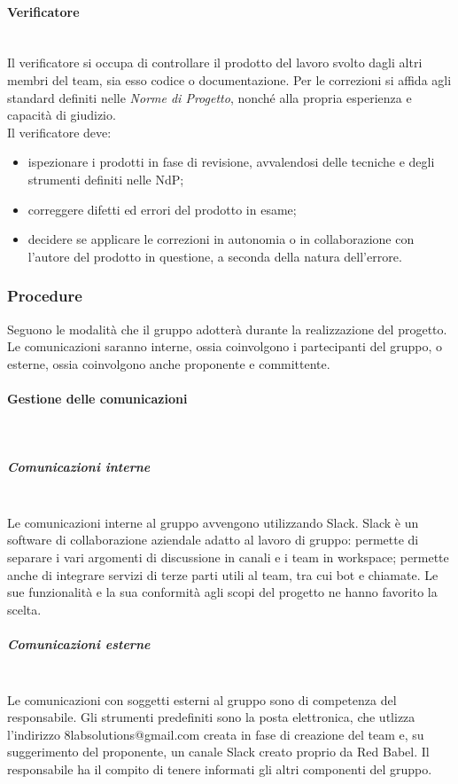 			\paragraph{Verificatore} \mbox{}\\
			Il verificatore si occupa di controllare il prodotto del lavoro svolto dagli altri membri del team, sia esso codice o documentazione. Per le correzioni si affida agli standard definiti nelle \textit{Norme di Progetto}, nonché alla propria esperienza e capacità di giudizio.\\
			Il verificatore deve:
			\begin{itemize}
				\item ispezionare i prodotti in fase di revisione, avvalendosi delle tecniche e degli strumenti definiti nelle NdP;
				\item correggere difetti ed errori del prodotto in esame;
				\item decidere se applicare le correzioni in autonomia o in collaborazione con l'autore del prodotto in questione, a seconda della natura dell'errore.
			\end{itemize}
		\subsubsection{Procedure}
		Seguono le modalità che il gruppo adotterà durante la realizzazione del progetto. Le comunicazioni saranno interne, ossia coinvolgono i partecipanti del gruppo, o esterne, ossia coinvolgono anche proponente e committente.
			\paragraph{Gestione delle comunicazioni} \mbox{}\\
			\subparagraph{Comunicazioni interne} \mbox{}\\
			Le comunicazioni interne al gruppo avvengono utilizzando Slack. Slack è un software di collaborazione aziendale adatto al lavoro di gruppo: permette di separare i vari argomenti di discussione in canali e i team in workspace; permette anche di integrare servizi di terze parti utili al team, tra cui bot e chiamate. Le sue funzionalità e la sua conformità agli scopi del progetto ne hanno favorito la scelta.
			\subparagraph{Comunicazioni esterne} \mbox{}\\
			Le comunicazioni con soggetti esterni al gruppo sono di competenza del responsabile. Gli strumenti predefiniti sono la posta elettronica, che utlizza l'indirizzo 8labsolutions@gmail.com creata in fase di creazione del team e, su suggerimento del proponente, un canale Slack creato proprio da Red Babel. Il responsabile ha il compito di tenere informati gli altri componenti del gruppo.
